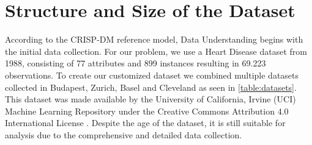 \section{Structure and Size of the Dataset} \label{sec:dataUnderstanding}


According to the CRISP-DM reference model, Data Understanding begins with the initial data collection. For our problem, we use a Heart Disease dataset from 1988, consisting of 77 attributes and 899 instances resulting in 69.223 observations. To create our customized dataset we combined multiple datasets collected in Budapest, Zurich, Basel and Cleveland as seen in \cref{table:datasets}. This dataset was made available by the University of California, Irvine (UCI) Machine Learning Repository under the Creative Commons Attribution 4.0 International License \citep{janosi1988}. Despite the age of the dataset, it is still suitable for analysis due to the comprehensive and detailed data collection. 

